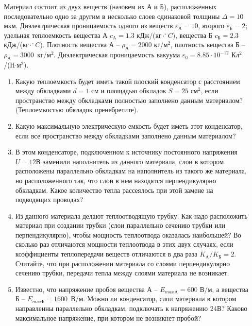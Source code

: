 
Материал состоит из двух веществ (назовем их А и Б), расположенных последовательно одно за другим в несколько слоев одинаковой толщины $\Delta = 10$ мкм. Диэлектрическая проницаемость одного из веществ $\varepsilon_\text{А} = 10$, второго $\varepsilon_\text{Б} = 2$; удельная теплоемкость вещества А $c_\text{A} = 1.3$ кДж/(кг$\cdot^{\circ}C$), вещества Б $c_\text{Б} = 2.3$ кДж/(кг$\cdot^{\circ}C$). Плотность вещества А – $\rho_\text{А} = 2000$ кг/м$^2$, плотность вещества Б – $\rho_\text{А} = 3000$~кг/м$^2$. Диэлектрическая проницаемость вакуума $\varepsilon_0 = 8.85\cdot10^{-12}$ Кл$^2$/(Н$\cdot$м$^2$).

\begin{enumerate}
    \item Какую теплоемкость будет иметь такой плоский конденсатор с расстоянием между обкладками $d = 1$ см и площадью обкладок $S = 25$ см$^2$, если пространство между обкладками полностью заполнено данным материалом? (Теплоемкостью обкладок пренебрегите).
    \item Какую максимальную электрическую емкость будет иметь этот конденсатор, если все пространство между обкладками заполнено данным материалом?
    \item В этом конденсаторе, подключенном к источнику постоянного напряжения $U = 12$В заменили наполнитель из данного материала, слои в котором расположены параллельно обкладкам на наполнитель из такого же материала, но расположенного так, что слои в нем находятся перпендикулярно обкладкам. Какое количество тепла рассеялось при этой замене на подводящих проводах? 
    \item Из данного материала делают теплоотводящую трубку. Как надо расположить материал при создании трубки (слои параллельно сечению трубки или перпендикулярно), чтобы мощность теплоотвода оказалась наибольшей? Во сколько раз отличаются мощности теплоотвода в этих двух случаях, если коэффициенты теплопередачи веществ отличаются в два раза $K_\text{A}/K_\text{Б} = 2$. Считайте, что при расположении материала со слоями перпендикулярно сечению трубки, передачи тепла между слоями материала не возникает.
    \item Известно, что напряжение пробоя вещества А – $E_{max\text{A}} = 600$ В/м, а вещества Б – $E_{max\text{Б}} = 1600$~В/м.  Можно ли конденсатор, слои материала в котором направленны параллельно обкладкам, подключать к напряжению 24В? Каково максимальное напряжение, при котором не возникнет пробой?
\end{enumerate}